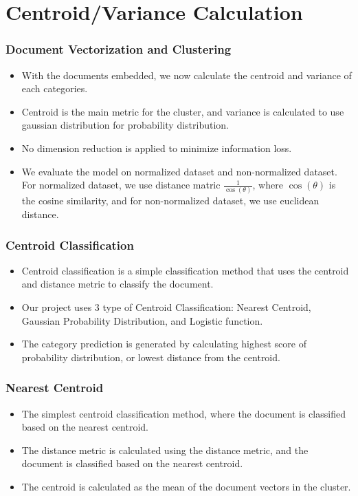 \documentclass[
  10pt %
  16:9, %
]{beamer}
\begin{document}
\section{Centroid/Variance Calculation}
\begin{frame}
  \frametitle{Document Vectorization and Clustering}
  \begin{itemize}
    \item With the documents embedded, we now calculate the centroid and variance of each categories.
    \item Centroid is the main metric for the cluster, and variance is calculated to use gaussian distribution for probability distribution.
    \item No dimension reduction is applied to minimize information loss.
    \item We evaluate the model on normalized dataset and non-normalized dataset. For normalized dataset, we use distance matric $\frac{1}{\cos(\theta)}$, where $\cos(\theta)$ is the cosine similarity, and for non-normalized dataset, we use euclidean distance.
  \end{itemize}
\end{frame}

\begin{frame}
  \frametitle{Centroid Classification}
  \begin{itemize}
    \item Centroid classification is a simple classification method that uses the centroid and distance metric to classify the document.
    \item Our project uses 3 type of Centroid Classification: Nearest Centroid, Gaussian Probability Distribution, and Logistic function.
    \item The category prediction is generated by calculating highest score of probability distribution, or lowest distance from the centroid.
  \end{itemize}
\end{frame}

\begin{frame}
  \frametitle{Nearest Centroid}
  \begin{itemize}
    \item The simplest centroid classification method, where the document is classified based on the nearest centroid.
    \item The distance metric is calculated using the distance metric, and the document is classified based on the nearest centroid.
    \item The centroid is calculated as the mean of the document vectors in the cluster.
  \end{itemize}
\end{frame}
\end{document}
